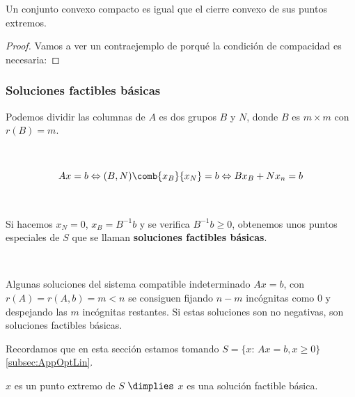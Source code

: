 \begin{prop}
Un conjunto convexo compacto es igual que el cierre convexo de sus puntos extremos.
\end{prop}

\begin{proof}
Vamos a ver un contraejemplo de porqué la condición de compacidad es necesaria:


%
%
\end{proof}

\begin{figure}[h]
\centering
{}
\end{figure}



\subsubsection{Soluciones factibles básicas}

Podemos dividir las columnas de $A$ es dos grupos $B$ y $N$, donde $B$ es $m\times m$ con $r(B)=m$.

\

\[
Ax=b \Leftrightarrow (B,N) {\comb{x_B}{x_N}}=b \Leftrightarrow B x_B + Nx_n = b
\]

\

Si hacemos $x_N=0$, $x_B=B^{-1}b$ y se verifica $B^{-1}b\geq 0$, obtenemos unos puntos especiales de $S$ que se llaman  \textbf{soluciones factibles básicas}.

\


Algunas soluciones del sistema compatible indeterminado $Ax=b$, con $r(A)=r(A,b)=m<n$ se consiguen fijando $n-m$ incógnitas como 0 y despejando las $m$ incógnitas restantes. Si estas soluciones son no negativas, son soluciones factibles básicas.

\obs Recordamos que en esta sección estamos tomando $S=\{x:\, Ax=b, x\geq 0\}$ \ref{subsec:AppOptLin}.

\begin{theorem}
$x$ es un punto extremo de $S$ $\dimplies$ $x$ es una solución factible básica.
\end{theorem}



